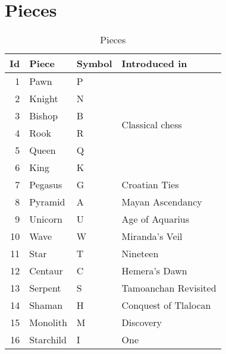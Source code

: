 \clearpage %

\section*{Pieces}
\label{sec:Appendix/Pieces}

\begin{table}[!h]
\centering
\begin{tabular}{ rlll }
\toprule
\textbf{Id} & \textbf{Piece} & \textbf{Symbol} & \textbf{Introduced in}           \\
\midrule
1           & Pawn           & P               & \multirow{6}{*}{Classical chess} \\
2           & Knight         & N               &                                  \\
3           & Bishop         & B               &                                  \\
4           & Rook           & R               &                                  \\
5           & Queen          & Q               &                                  \\
6           & King           & K               &                                  \\ \cmidrule{1-4}
7           & Pegasus        & G               & Croatian Ties                    \\
8           & Pyramid        & A               & Mayan Ascendancy                 \\
9           & Unicorn        & U               & Age of Aquarius                  \\
10          & Wave           & W               & Miranda's Veil                   \\
11          & Star           & T               & Nineteen                         \\
12          & Centaur        & C               & Hemera's Dawn                    \\
13          & Serpent        & S               & Tamoanchan Revisited             \\
14          & Shaman         & H               & Conquest of Tlalocan             \\
15          & Monolith       & M               & Discovery                        \\
16          & Starchild      & I               & One                              \\
\bottomrule
\end{tabular}
\caption{Pieces}
\label{tbl:Appendix/Pieces}
\end{table}

